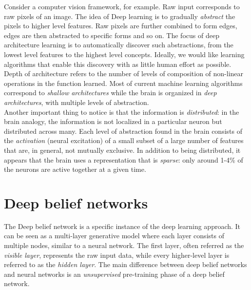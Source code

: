 Consider a computer vision framework, for example. Raw input corresponds to raw pixels of an image. The idea of Deep learning is to gradually \textit{abstract} the pixels to higher level features. Raw pixels are further combined to form edges, edges are then abstracted to specific forms and so on. The focus of deep architecture learning is to automatically discover such abstractions, from the lowest level features to the highest level concepts. Ideally, we would like learning algorithms that enable this discovery with as little human effort as possible. \\

Depth of architecture refers to the number of levels of composition of non-linear operations in the function learned. Most of current machine learning algorithms correspond to \textit{shallow architectures} while the brain is organized in \textit{deep architectures}, with multiple levels of abstraction. \\

Another important thing to notice is that the information is \textit{distributed}: in the brain analogy, the information is not localized in a particular neuron but distributed across many. Each level of abstraction found in the brain consists of the \textit{activation} (neural excitation) of a small subset of a large number of features that are, in general, not mutually exclusive. In addition to being distributed, it appears that the brain uses a representation that is \textit{sparse}: only around 1-4\% of the neurons are active together at a given time.


\section{Deep belief networks}

The Deep belief network is a specific instance of the deep learning approach. It can be seen as a multi-layer generative model where each layer consists of multiple nodes, similar to a neural network. The first layer, often referred as the \textit{visible layer}, represents the raw input data, while every higher-level layer is referred to as the \textit{hidden layer}. The main difference between deep belief networks and neural networks is an \textit{unsupervised} pre-training phase of a deep belief network. \\

